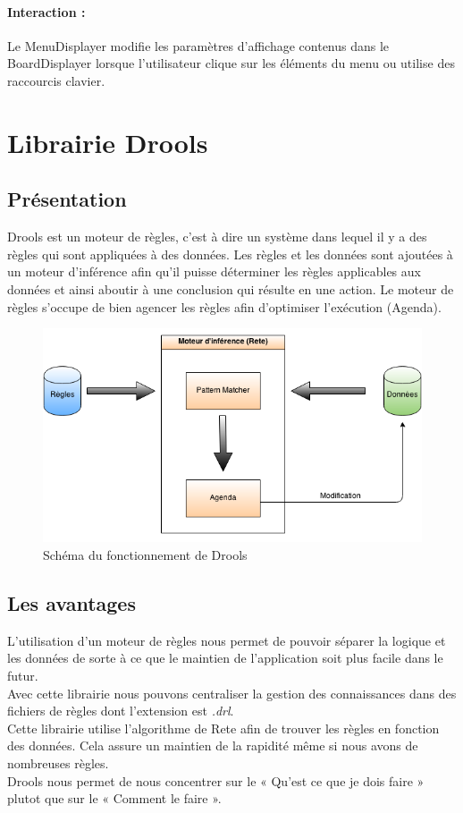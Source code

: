 			\paragraph{Interaction :}
			Le MenuDisplayer modifie les paramètres d'affichage contenus dans le BoardDisplayer lorsque l'utilisateur clique
			sur les éléments du menu ou utilise des raccourcis clavier.

	\section{Librairie Drools}

		\subsection{Présentation}
			Drools est un moteur de règles, c'est à dire un système dans lequel il y a des règles qui sont appliquées à des données. 
			Les règles et les données sont ajoutées	à un moteur d'inférence afin qu'il puisse déterminer les règles applicables aux données et ainsi aboutir à une conclusion qui résulte en une action.
			Le moteur de règles s'occupe de bien agencer les règles afin d'optimiser l'exécution (Agenda).

		
			\begin{figure}[!h]
			    \caption{Schéma du fonctionnement de Drools}
			    \centerline{\includegraphics[scale=0.7]{images/architecture/drools_schema.png}}
			\end{figure}


		\subsection{Les avantages}
			L'utilisation d'un moteur de règles nous permet de pouvoir séparer la logique et les données de sorte à ce que le maintien de l'application soit plus facile dans le futur.
			\\
			Avec cette librairie nous pouvons centraliser la gestion des connaissances dans des fichiers de règles dont l'extension est {\itshape .drl}.
			\\
			Cette librairie utilise l'algorithme de Rete afin de trouver les règles en fonction des données. Cela assure un maintien de la rapidité même si nous avons de nombreuses règles.
			\\
			Drools nous permet de nous concentrer sur le « Qu'est ce que je dois faire » plutot que sur le « Comment le faire ».


